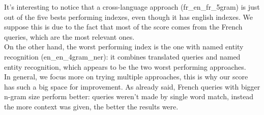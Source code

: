 It's interesting to notice that a cross-language approach (fr\_en\_fr\_5gram) is just out of the five bests performing indexes, even though it has english indexes. We suppose this is due to the fact that most of the score comes from the French queries, which are the most relevant ones.\\
On the other hand, the worst performing index is the one with named entity recognition (en\_en\_4gram\_ner): it combines translated queries and named entity recognition, which appears to be the two worst performing approaches.\\
In general, we focus more on trying multiple approaches, this is why our score has such a big space for improvement. As already said, French queries with bigger n-gram size perform better: queries weren't made by single word match, instead the more context was given, the better the results were.\\

